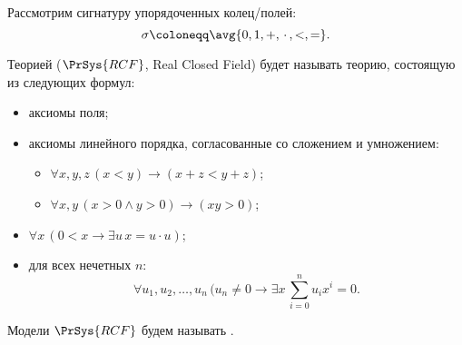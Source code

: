 Рассмотрим сигнатуру упорядоченных колец/полей:
$$
    \sigma \coloneqq \avg{0, 1, +, \,\cdot\,, <, =}.
$$

Теорией  ($\PrSys{RCF}$, Real Closed Field) будет называть теорию,
состоящую из следующих формул:
\begin{itemize}
    \item аксиомы поля;
    \item аксиомы линейного порядка, согласованные со сложением и умножением:
        \begin{itemize}
            \item $\forall x, y, z\, (x < y) \rightarrow (x + z < y + z)$;
            \item $\forall x, y\, (x > 0 \land y > 0) \rightarrow (xy > 0)$;
        \end{itemize}
    \item $\forall x\, (0 < x \rightarrow \exists u\, x = u \cdot u)$;
    \item для всех нечетных $n$:
        $$
            \forall u_1, u_2, \dots, u_n\, (u_n \ne 0 \rightarrow \exists x\, \sum\limits_{i = 0}^n u_i
            x^i = 0.
        $$
\end{itemize}

Модели $\PrSys{RCF}$ будем называть .
